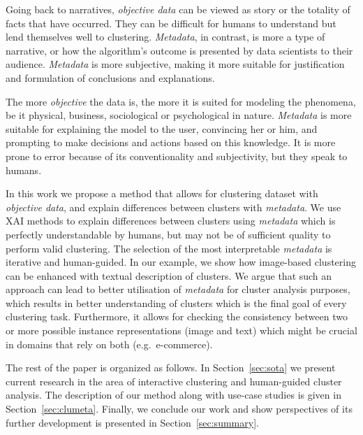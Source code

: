 \documentclass[
 twocolumn,
 hf,
]{ceurart}
\begin{document}
Going back to narratives, \textit{objective data} can be viewed as story or the totality of facts that have occurred.
They can be difficult for humans to understand but lend themselves well to clustering.
\textit{Metadata}, in contrast, is more a type of narrative, or how the algorithm's outcome is presented by data scientists to their audience.
\textit{Metadata} is more subjective, making it more suitable for justification and formulation of conclusions and explanations.

The more \textit{objective} the data is, the more it is suited for modeling the phenomena, be it physical, business, sociological or psychological in nature.
\textit{Metadata} is more suitable for explaining the model to the user, convincing her or him, and prompting to make decisions and actions based on this knowledge.
It is more prone to error because of its conventionality and subjectivity, but they speak to humans.

In this work we propose a method that allows for clustering dataset with \textit{objective data}, and explain differences between clusters with \textit{metadata}.
We use XAI methods to explain differences between clusters using \textit{metadata} which is perfectly understandable by humans, but may not be of sufficient quality to perform valid clustering.
The selection of the most interpretable \textit{metadata} is iterative and human-guided.
In our example, we show how image-based clustering can be enhanced with textual description of clusters.
We argue that such an approach can lead to better utilisation of \textit{metadata} for cluster analysis purposes, which results in better understanding of clusters which is the final goal of every clustering task. %
Furthermore, it allows for checking the consistency between two or more possible instance representations (image and text) which might be crucial in domains that rely on both (e.g.\ e-commerce).

The rest of the paper is organized as follows.
In Section~\ref{sec:sota} we present current research in the area of interactive clustering and human-guided cluster analysis.
The description of our method along with use-case studies is given in Section~\ref{sec:clumeta}.
Finally, we conclude our work and show perspectives of its further development is presented in Section~\ref{sec:summary}.
\end{document}
